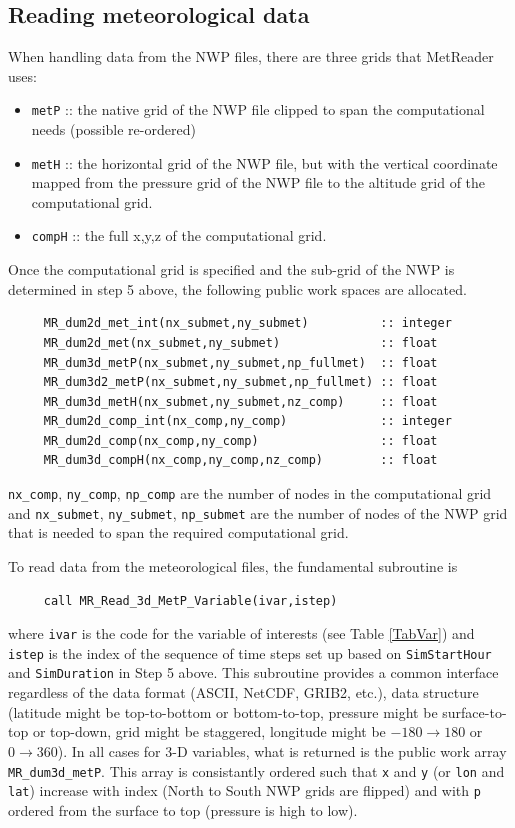 \documentclass[11pt]{article}   %
\begin{document}
\subsection{Reading meteorological data}
When handling data from the NWP files, there are three grids that MetReader uses:
\begin{itemize}
\item \texttt{metP} :: the native grid of the NWP file clipped to span the
computational needs (possible re-ordered)
\item \texttt{metH} :: the horizontal grid of the NWP file, but with the vertical
coordinate mapped from the pressure grid of the NWP file to the altitude grid of 
the computational grid.
\item \texttt{compH} :: the full x,y,z of the computational grid.
\end{itemize}
Once the computational grid is specified and the sub-grid of the NWP is determined in 
step 5 above, the following public work spaces are allocated.
\begin{verbatim}
     MR_dum2d_met_int(nx_submet,ny_submet)          :: integer
     MR_dum2d_met(nx_submet,ny_submet)              :: float
     MR_dum3d_metP(nx_submet,ny_submet,np_fullmet)  :: float
     MR_dum3d2_metP(nx_submet,ny_submet,np_fullmet) :: float
     MR_dum3d_metH(nx_submet,ny_submet,nz_comp)     :: float
     MR_dum2d_comp_int(nx_comp,ny_comp)             :: integer
     MR_dum2d_comp(nx_comp,ny_comp)                 :: float
     MR_dum3d_compH(nx_comp,ny_comp,nz_comp)        :: float
\end{verbatim}
\texttt{nx\_comp}, \texttt{ny\_comp}, \texttt{np\_comp} are the number
of nodes in the computational grid and 
\texttt{nx\_submet}, \texttt{ny\_submet}, \texttt{np\_submet} are the
number of nodes of the NWP grid that is needed
to span the required computational grid.

To read data from the meteorological files, the fundamental subroutine is
\begin{verbatim}
     call MR_Read_3d_MetP_Variable(ivar,istep)
\end{verbatim}
where \texttt{ivar} is the code for the variable of interests
(see Table \ref{TabVar}) and
\texttt{istep} is the index of the sequence of time steps set up based on
\texttt{SimStartHour} and \texttt{SimDuration} in Step 5 above.  This subroutine provides
a common interface regardless of the data format (ASCII, NetCDF, GRIB2, etc.), data
structure (latitude might be top-to-bottom or bottom-to-top, pressure might be surface-to-top
or top-down, grid might be staggered, longitude might be $-180 \rightarrow 180$ or $0 \rightarrow 360$).
In all cases for 3-D variables, what is returned is the public work array
\texttt{MR\_dum3d\_metP}.
This array is consistantly ordered such that \texttt{x}
and \texttt{y} (or \texttt{lon} and \texttt{lat}) increase with index (North to South NWP grids
are flipped) and with \texttt{p} ordered from the surface to top (pressure is high to low).
\end{document}
